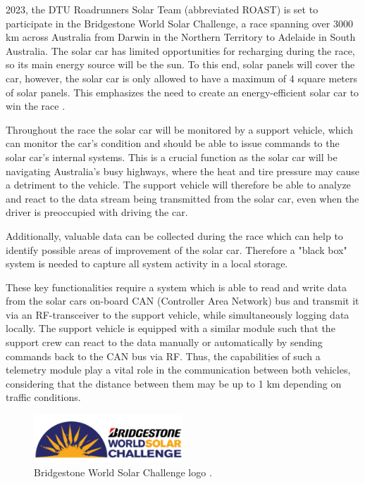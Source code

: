 \documentclass[conference]{IEEEtran}
\begin{document}
 2023, the DTU Roadrunners Solar Team (abbreviated ROAST) is set to participate in the Bridgestone World Solar Challenge, a race spanning over 3000 km across Australia from Darwin in the Northern Territory to Adelaide in South Australia. The solar car has limited opportunities for recharging during the race, so its main energy source will be the sun. To this end, solar panels will cover the car, however, the solar car is only allowed to have a maximum of 4 square meters of solar panels. This emphasizes the need to create an energy-efficient solar car to win the race \cite{wsc}.

Throughout the race the solar car will be monitored by a support vehicle, which can monitor the car's condition and should be able to issue commands to the solar car's internal systems. This is a crucial function as the solar car will be navigating Australia's busy highways, where the heat and tire pressure may cause a detriment to the vehicle. The support vehicle will therefore be able to analyze and react to the data stream being transmitted from the solar car, even when the driver is preoccupied with driving the car. 

Additionally, valuable data can be collected during the race which can help to identify possible areas of improvement of the solar car. Therefore a "black box" system is needed to capture all system activity in a local storage.

These key functionalities require a system which is able to read and write data from the solar cars on-board CAN (Controller Area Network) bus and transmit it via an RF-transceiver to the support vehicle, while simultaneously logging data locally. The support vehicle is equipped with a similar module such that the support crew can react to the data manually or automatically by sending commands back to the CAN bus via RF. Thus, the capabilities of such a telemetry module play a vital role in the communication between both vehicles, considering that the distance between them may be up to 1 km depending on traffic conditions.

\begin{figure}[b]
    \centering
    \includegraphics[width=0.5\textwidth]{documentation/images/SolarChallengeLogo.pdf}
    \caption{Bridgestone World Solar Challenge logo \cite{wsc}.}
    \label{fig:solar}
\end{figure}
\end{document}
